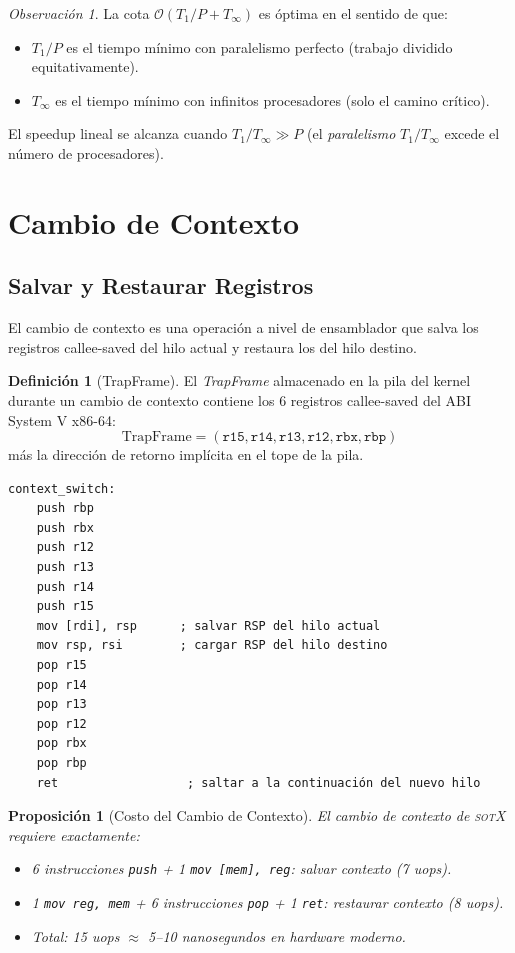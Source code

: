 \documentclass[11pt,twoside,openright]{book}
\theoremstyle{definition}
\newtheorem{definition}{Definición}[chapter]
\theoremstyle{plain}
\newtheorem{proposition}[theorem]{Proposición}
\theoremstyle{remark}
\newtheorem{remark}{Observación}[chapter]
\newcommand{\sotos}{\textsc{sotX}}
\newcommand{\bigO}{\mathcal{O}}
\begin{document}
\begin{remark}
La cota $\bigO(T_1/P + T_\infty)$ es óptima en el sentido de que:
\begin{itemize}
    \item $T_1/P$ es el tiempo mínimo con paralelismo perfecto (trabajo dividido equitativamente).
    \item $T_\infty$ es el tiempo mínimo con infinitos procesadores (solo el camino crítico).
\end{itemize}
El speedup lineal se alcanza cuando $T_1/T_\infty \gg P$ (el \emph{paralelismo}
$T_1/T_\infty$ excede el número de procesadores).
\end{remark}

\section{Cambio de Contexto}

\subsection{Salvar y Restaurar Registros}

El cambio de contexto es una operación a nivel de ensamblador que salva los registros
callee-saved del hilo actual y restaura los del hilo destino.

\begin{definition}[TrapFrame]
\label{def:trapframe}
El \emph{TrapFrame} almacenado en la pila del kernel durante un cambio de contexto contiene
los 6 registros callee-saved del ABI System V x86-64:
\[
    \text{TrapFrame} = (\texttt{r15}, \texttt{r14}, \texttt{r13}, \texttt{r12},
                        \texttt{rbx}, \texttt{rbp})
\]
más la dirección de retorno implícita en el tope de la pila.
\end{definition}

\begin{lstlisting}[language={[x86masm]Assembler}, caption={Rutina de cambio de contexto
(\texttt{context\_switch}). RDI = puntero a RSP antiguo; RSI = RSP nuevo.},
label={lst:context-switch}]
context_switch:
    push rbp
    push rbx
    push r12
    push r13
    push r14
    push r15
    mov [rdi], rsp      ; salvar RSP del hilo actual
    mov rsp, rsi        ; cargar RSP del hilo destino
    pop r15
    pop r14
    pop r13
    pop r12
    pop rbx
    pop rbp
    ret                  ; saltar a la continuación del nuevo hilo
\end{lstlisting}

\begin{proposition}[Costo del Cambio de Contexto]
\label{prop:ctx-switch-cost}
El cambio de contexto de \sotos{} requiere exactamente:
\begin{itemize}
    \item 6 instrucciones \texttt{push} + 1 \texttt{mov [mem], reg}: salvar contexto (7 uops).
    \item 1 \texttt{mov reg, mem} + 6 instrucciones \texttt{pop} + 1 \texttt{ret}:
          restaurar contexto (8 uops).
    \item Total: 15 uops $\approx$ 5--10 nanosegundos en hardware moderno.
\end{itemize}
\end{proposition}
\end{document}
